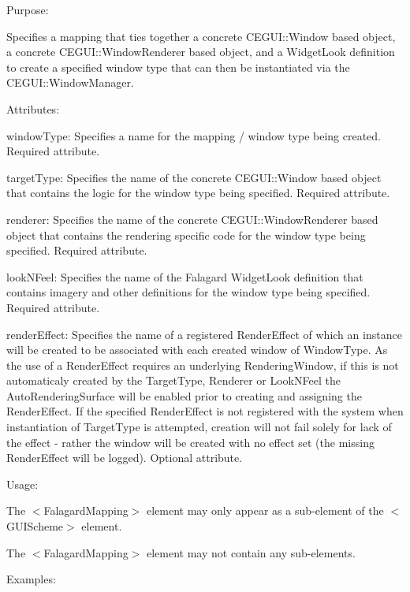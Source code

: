 \begin{DoxyItemize}
\item Purpose\+:
\begin{DoxyItemize}
\item Specifies a mapping that ties together a concrete C\+E\+G\+U\+I\+::\+Window based object, a concrete C\+E\+G\+U\+I\+::\+Window\+Renderer based object, and a Widget\+Look definition to create a specified window type that can then be instantiated via the C\+E\+G\+U\+I\+::\+Window\+Manager.
\end{DoxyItemize}
\item Attributes\+:
\begin{DoxyItemize}
\item {\ttfamily window\+Type\+:} Specifies a name for the mapping / window type being created. Required attribute.
\item {\ttfamily target\+Type\+:} Specifies the name of the concrete C\+E\+G\+U\+I\+::\+Window based object that contains the logic for the window type being specified. Required attribute.
\item {\ttfamily renderer\+:} Specifies the name of the concrete C\+E\+G\+U\+I\+::\+Window\+Renderer based object that contains the rendering specific code for the window type being specified. Required attribute.
\item {\ttfamily look\+N\+Feel\+:} Specifies the name of the Falagard Widget\+Look definition that contains imagery and other definitions for the window type being specified. Required attribute.
\item {\ttfamily render\+Effect\+:} Specifies the name of a registered Render\+Effect of which an instance will be created to be associated with each created window of Window\+Type. As the use of a Render\+Effect requires an underlying Rendering\+Window, if this is not automaticaly created by the Target\+Type, Renderer or Look\+N\+Feel the Auto\+Rendering\+Surface will be enabled prior to creating and assigning the Render\+Effect. If the specified Render\+Effect is not registered with the system when instantiation of Target\+Type is attempted, creation will not fail solely for lack of the effect -\/ rather the window will be created with no effect set (the missing Render\+Effect will be logged). Optional attribute.
\end{DoxyItemize}
\item Usage\+:
\begin{DoxyItemize}
\item The $<$Falagard\+Mapping$>$ element may only appear as a sub-\/element of the $<$G\+U\+I\+Scheme$>$ element.
\item The $<$Falagard\+Mapping$>$ element may not contain any sub-\/elements.
\end{DoxyItemize}
\item Examples\+:
\end{DoxyItemize}

